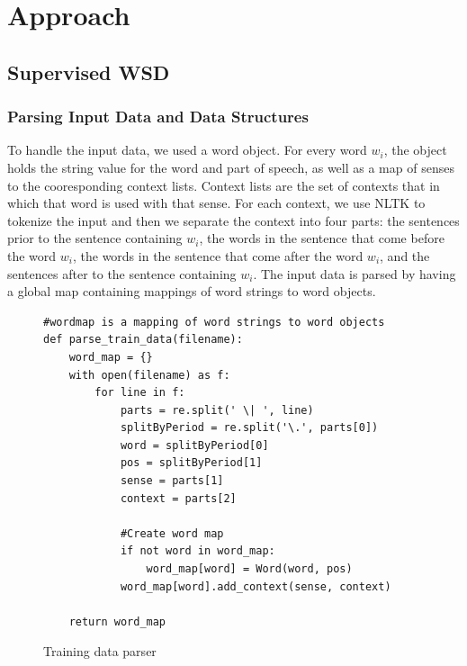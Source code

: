 \documentclass[11pt]{article}
\begin{document}
\setlength{\parindent}{0in}
\addtolength{\parskip}{0.1cm}
\setlength{\fboxrule}{.5mm}\setlength{\fboxsep}{1.2mm}
\newlength{\boxlength}\setlength{\boxlength}{\textwidth}
\addtolength{\boxlength}{-4mm}

\begin{center}
\end{center}

\section{Approach}
\subsection{Supervised WSD}
\subsubsection{Parsing Input Data and Data Structures}

To handle the input data, we used a word object. For every word $w_i$, the object holds the string value for the word and part of speech, as well as a map of senses to the cooresponding context lists. Context lists are the set of contexts that in which that word is used with that sense. For each context, we use NLTK to tokenize the input and then we separate the context into four parts: the sentences prior to the sentence containing $w_i$, the words in the sentence that come before the word $w_i$, the words in the sentence that come after the word $w_i$, and the sentences after to the sentence containing $w_i$. The input data is parsed by having a global map containing mappings of word strings to word objects. 

\begin{figure}[ht]
\begin{lstlisting}
#wordmap is a mapping of word strings to word objects
def parse_train_data(filename):
    word_map = {}
    with open(filename) as f:
        for line in f:
            parts = re.split(' \| ', line)
            splitByPeriod = re.split('\.', parts[0])
            word = splitByPeriod[0]
            pos = splitByPeriod[1]
            sense = parts[1]
            context = parts[2]

            #Create word map
            if not word in word_map:
                word_map[word] = Word(word, pos)
            word_map[word].add_context(sense, context)

    return word_map
\end{lstlisting}
\caption{Training data parser}
\label{Training data parser}
\end{figure}
\end{document}

